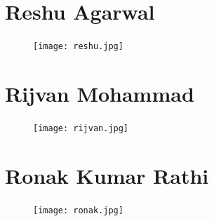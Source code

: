 \documentclass[twoside,a4paper,16pt]{book}
\begin{document}
 \vspace{0.2cm}



\newpage

\section{Reshu Agarwal}


\vspace{0.6cm}

\begin{figure}[ht!]
\begin{center}
\texttt{[image: reshu.jpg]}
\end{center}
\end{figure}

 \vspace{0.2cm}


\newpage
\section{Rijvan Mohammad}


\vspace{0.6cm}

\begin{figure}[ht!]
\begin{center}
\texttt{[image: rijvan.jpg]}
\end{center}
\end{figure}

 \vspace{0.2cm}


\newpage
\section{Ronak Kumar Rathi}


\vspace{0.6cm}

\begin{figure}[ht!]
\begin{center}
\texttt{[image: ronak.jpg]}
\end{center}
\end{figure}

 \vspace{0.2cm}
\end{document}
